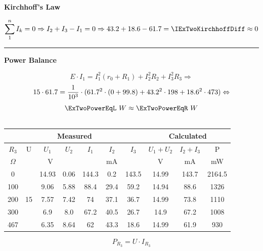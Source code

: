 \documentclass{article}
\begin{document}
			\begin{minipage}{\textwidth}
				\begin{center} \textbf{Kirchhoff's Law} \end{center}
				\[
					\sum_{1}^{n} I_k = 0 \Rightarrow I_2 + I_3 - I_1 = 0 \Rightarrow \IExTwoTwo + \IExTwoThree - \IExTwoOne = \IExTwoKirchhoffDiff \approx 0
				\]
				\hrule
				\begin{center} \textbf{Power Balance} \end{center}



				\[
					E \cdot I_1 = I_1 ^ 2 (r_0 + R_1) + I_2 ^ 2 R_2 + I_3 ^ 2 R_3 \Rightarrow
				\]
				\[
					15 \cdot 61.7 = \frac{1}{10 ^ 3} \cdot (61.7 ^ 2 \cdot (0 + 99.8) + 43.2 ^ 2 \cdot 198 + 18.6 ^ 2 \cdot 473)  \Leftrightarrow
				\]
				\[
					\ExTwoPowerEqL \ W \approx \ExTwoPowerEqR \ W
				\]
			\end{minipage}

		\subsection{}
			\begin{center} \begin{tabular}{|c|c|c|c|c|c|c|c|c|c|}
				\hline
				\multicolumn{7}{|c}{\textbf{Measured}} & \multicolumn{3}{|c|}{\textbf{Calculated}}\\
				\hline
				$R_3$ & U & $U_1$ & $U_2$ & $I_1$ & $I_2$ & $I_3$ & $U_1 + U_2$ & $I_2 + I_3$ & P\\
				\hline
				$\Omega$ & \multicolumn{3}{c|}{V} & \multicolumn{3}{c|}{mA} & V & mA & mW\\	
				\hline
				0 & \multirow{6}{*}{15} & 14.93 & 0.06 & 144.3 & 0.2 & 143.5 & 14.99 & 143.7 & 2164.5\\
				100 & & 9.06 & 5.88 & 88.4 & 29.4 & 59.2 & 14.94 & 88.6 & 1326\\
				200 & & 7.57 & 7.42 & 74 & 37.1 & 36.7 & 14.99 & 73.8 & 1110\\
				300 & & 6.9 & 8.0 & 67.2 & 40.5 & 26.7 & 14.9 & 67.2 & 1008\\
				467 & & 6.35 & 8.64 & 62 & 43.3 & 18.6 & 14.99 & 61.9 & 930\\
				\hline
			\end{tabular} \end{center}
			\[
				P_{R_3} = U \cdot I_{R_3} 
			\]
\end{document}
